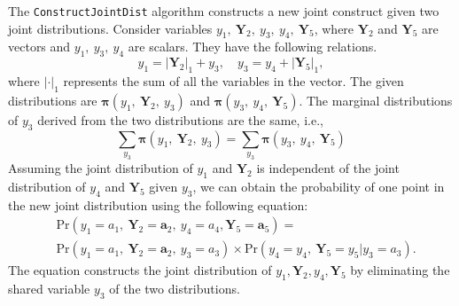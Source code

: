 \documentclass[a4paper,review,12pt,authoryear]{elsarticle}
\let\code=\texttt
\newcommand{\bY}{\mathbf{Y}}
\newcommand{\bpi}{\bm{\pi}}
\theoremstyle{definition}
\begin{document}
 The \code{ConstructJointDist} algorithm constructs a new joint construct given two joint distributions.
 Consider variables $y_1, ~ \bY_2, ~ y_3, ~ y_4, ~ \bY_5$, where $\bY_2$ and $\bY_5$ are vectors and $y_1, ~ y_3, ~ y_4$ are scalars.
 They have the following relations.
 \[
  y_1 = |\bY_2|_1 + y_3, \quad y_3 = y_4 + |\bY_5|_1,
 \]
 where $|\cdot|_1$ represents the sum of all the variables in the vector.
 The given distributions are $\bpi(y_1, ~ \bY_2, ~ y_3)$ and $\bpi(y_3, ~ y_4, ~ \bY_5)$.
 The marginal distributions of $y_3$ derived from the two distributions are the same, i.e.,
 \[
  \sum_{y_3} \bpi(y_1, ~ \bY_2, ~ y_3) = \sum_{y_3}\bpi(y_3, ~ y_4, ~ \bY_5)
\]
 Assuming the joint distribution of $y_1$ and $\bY_2$ is independent of the joint distribution of $y_4$ and $\bY_5$ given $y_3$, we can obtain the probability of one point in the new joint distribution using the following equation: \[
   \begin{aligned}
  &\text{Pr}(y_1=a_1, ~ \bY_2=\mathbf{a}_2, ~ y_4=a_4, \bY_5 = \mathbf{a}_5) =\\ &\text{Pr} (y_1=a_1, ~ \bY_2=\mathbf{a}_2, ~ y_3=a_3) \times \text{Pr}(y_4=y_4, ~ \bY_5=y_5|y_3=a_3).
   \end{aligned}
 \]
 The equation constructs the joint distribution of $y_1, \bY_2, y_4, \bY_5$ by eliminating the shared variable $y_3$ of the two distributions.
\end{document}
